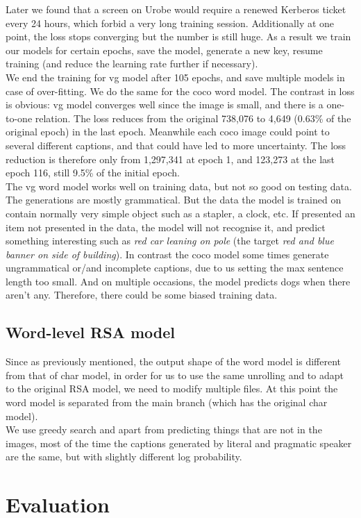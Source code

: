 \documentclass[a4paper]{scrartcl}
\begin{document}
Later we found that a screen on Urobe would require a renewed Kerberos ticket every 24 hours, which forbid a very long training session. Additionally at one point, the loss stops converging but the number is still huge. As a result we train our models for certain epochs, save the model, generate a new key, resume training (and reduce the learning rate further if necessary). \\

We end the training for vg model after 105 epochs, and save multiple models in case of over-fitting. We do the same for the coco word model. The contrast in loss is obvious: vg model converges well since the image is small, and there is a one-to-one relation. The loss reduces from the original 738,076 to 4,649 (0.63\% of the original epoch) in the last epoch. Meanwhile each coco image could point to several different captions, and that could have led to more uncertainty. The loss reduction is therefore only from 1,297,341 at epoch 1, and 123,273 at the last epoch 116, still 9.5\% of the initial epoch.\\

The vg word model works well on training data, but not so good on testing data. The generations are mostly grammatical. But the data the model is trained on contain normally very simple object such as a stapler, a clock, etc. If presented an item not presented in the data, the model will not recognise it, and predict something interesting such as \emph{red car leaning on pole} (the target \emph{red and blue banner on side of building}). In contrast the coco model some times generate ungrammatical or/and incomplete captions, due to us setting the max sentence length too small. And on multiple occasions, the model predicts dogs when there aren't any. Therefore, there could be some biased training data.  
\subsection*{Word-level RSA model}
Since as previously mentioned, the output shape of the word model is different from that of char model, in order for us to use the same unrolling and to adapt to the original RSA model, we need to modify multiple files. At this point the word model is separated from the main branch (which has the original char model). \\

We use greedy search and apart from predicting things that are not in the images, most of the time the captions generated by literal and pragmatic speaker are the same, but with slightly different log probability. 
\section*{Evaluation}
\end{document}
